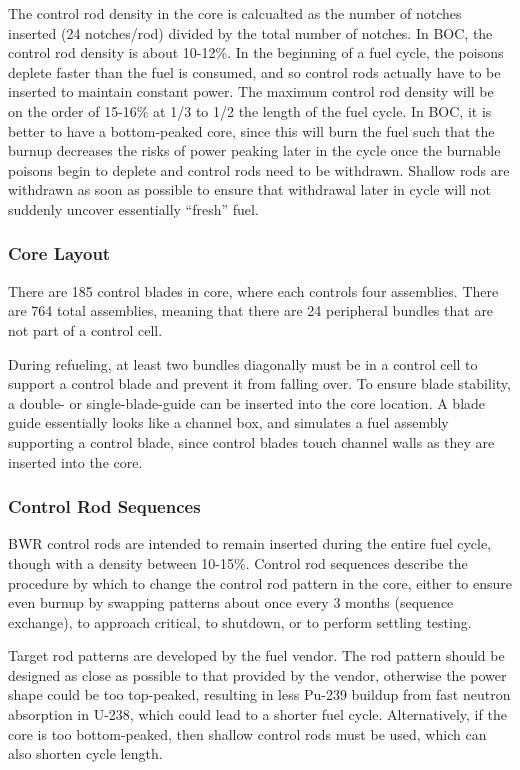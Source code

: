 \documentclass[10pt]{article}
\begin{document}
The control rod density in the core is calcualted as the number of notches inserted (24 notches/rod) divided by the total number of notches. In BOC, the control rod density is about 10-12\%. In the beginning of a fuel cycle, the poisons deplete faster than the fuel is consumed, and so control rods actually have to be inserted to maintain constant power. The maximum control rod density will be on the order of 15-16\% at 1/3 to 1/2 the length of the fuel cycle. In BOC, it is better to have a bottom-peaked core, since this will burn the fuel such that the burnup decreases the risks of power peaking later in the cycle once the burnable poisons begin to deplete and control rods need to be withdrawn. Shallow rods are withdrawn as soon as possible to ensure that withdrawal later in cycle will not suddenly uncover essentially “fresh” fuel. 

\subsubsection{Core Layout}

There are 185 control blades in  core, where each controls four assemblies. There are 764 total assemblies, meaning that there are 24 peripheral bundles that are not part of a control cell.

During refueling, at least two bundles diagonally must be in a control cell to support a control blade and prevent it from falling over. To ensure blade stability, a double- or single-blade-guide can be inserted into the core location. A blade guide essentially looks like a channel box, and simulates a fuel assembly supporting a control blade, since control blades touch channel walls as they are inserted into the core.

\subsubsection{Control Rod Sequences}

BWR control rods are intended to remain inserted during the entire fuel cycle, though with a density between 10-15\%. Control rod sequences describe the procedure by which to change the control rod pattern in the core, either to ensure even burnup by swapping patterns about once every 3 months (sequence exchange), to approach critical, to shutdown, or to perform settling testing. 

Target rod patterns are developed by the fuel vendor. The rod pattern should be designed as close as possible to that provided by the vendor, otherwise the power shape could be too top-peaked, resulting in less Pu-239 buildup from fast neutron absorption in U-238, which could lead to a shorter fuel cycle. Alternatively, if the core is too bottom-peaked, then shallow control rods must be used, which can also shorten cycle length. 
\end{document}
